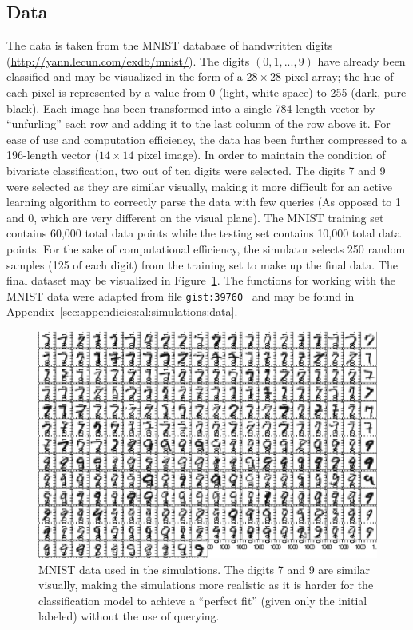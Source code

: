 \subsection{Data}
\label{sec:al:simulation:data}
The data is taken from the MNIST database of handwritten digits 
(\url{http://yann.lecun.com/exdb/mnist/}). The digits $(0,1,...,9)$ have 
already been classified and may be visualized in the form of a $28\times 28$ 
pixel array; the hue of each pixel is represented by a value from 0 
(light, white space) to 255 (dark, pure black). 
Each image has been transformed into a single 
784-length vector by ``unfurling'' each row and adding it to the last column of 
the row above it. For ease of use and computation efficiency, the data has been 
further compressed to a 196-length vector ($14\times 14$ pixel image). In order 
to maintain the condition of bivariate classification, two out of ten digits 
were selected. The digits 7 and 9 were selected as they are similar visually, 
making it more difficult for an active learning algorithm to correctly parse 
the data with few queries (As opposed to 1 and 0, which are very different on 
the visual plane). The MNIST training set contains 60,000 total data points 
while the testing set contains 10,000 total data points. For the sake of 
computational efficiency, the simulator selects 250 random samples (125 of each 
digit) from the training set to make up the final data. 
The final dataset may be visualized in Figure~\ref{fig:al:simulations:data}. 
The functions for working with the MNIST data were adapted from file 
\texttt{gist:39760}~\cite{oconnor2008} and may be found in 
Appendix~\ref{sec:appendicies:al:simulations:data}.

\begin{figure}[htb]
	\begin{center}
		\includegraphics[width=1\linewidth]{ch-al/figures/data.pdf}
		\caption[MNIST data used in the simulations.]{MNIST data used in the 
		simulations. The digits 7 and 9 are similar visually, making 
		the simulations more realistic as it is harder for the classification 
		model to achieve a ``perfect fit'' (given only the initial labeled) 
		without the use of querying.}
		\label{fig:al:simulations:data}
	\end{center}
\end{figure}

